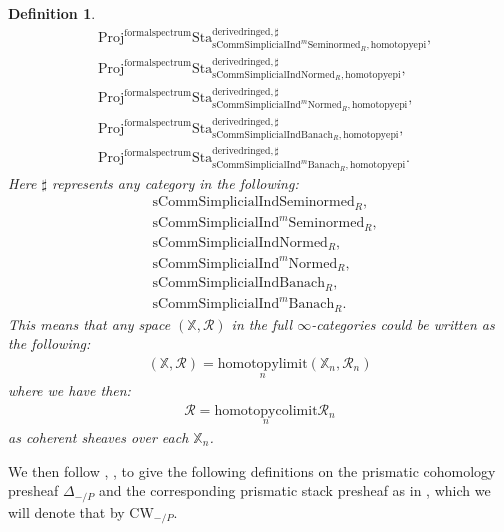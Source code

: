 \documentclass[12pt]{book}
\newtheorem{definition}{Definition}
\begin{document}
\begin{definition}
\begin{align}
&\mathrm{Proj}^\mathrm{formalspectrum}\mathrm{Sta}^\mathrm{derivedringed,\sharp}_{\mathrm{sComm}\mathrm{Simplicial}\mathrm{Ind}^m\mathrm{Seminormed}_R,\mathrm{homotopyepi}},\\
&\mathrm{Proj}^\mathrm{formalspectrum}\mathrm{Sta}^\mathrm{derivedringed,\sharp}_{\mathrm{sComm}\mathrm{Simplicial}\mathrm{Ind}\mathrm{Normed}_R,\mathrm{homotopyepi}},\\
&\mathrm{Proj}^\mathrm{formalspectrum}\mathrm{Sta}^\mathrm{derivedringed,\sharp}_{\mathrm{sComm}\mathrm{Simplicial}\mathrm{Ind}^m\mathrm{Normed}_R,\mathrm{homotopyepi}},\\
&\mathrm{Proj}^\mathrm{formalspectrum}\mathrm{Sta}^\mathrm{derivedringed,\sharp}_{\mathrm{sComm}\mathrm{Simplicial}\mathrm{Ind}\mathrm{Banach}_R,\mathrm{homotopyepi}},\\
&\mathrm{Proj}^\mathrm{formalspectrum}\mathrm{Sta}^\mathrm{derivedringed,\sharp}_{\mathrm{sComm}\mathrm{Simplicial}\mathrm{Ind}^m\mathrm{Banach}_R,\mathrm{homotopyepi}}.	
\end{align}
Here $\sharp$ represents any category in the following:
\begin{align}
&\mathrm{sComm}\mathrm{Simplicial}\mathrm{Ind}\mathrm{Seminormed}_R,\\
&\mathrm{sComm}\mathrm{Simplicial}\mathrm{Ind}^m\mathrm{Seminormed}_R,\\
&\mathrm{sComm}\mathrm{Simplicial}\mathrm{Ind}\mathrm{Normed}_R,\\
&\mathrm{sComm}\mathrm{Simplicial}\mathrm{Ind}^m\mathrm{Normed}_R,\\
&\mathrm{sComm}\mathrm{Simplicial}\mathrm{Ind}\mathrm{Banach}_R,\\
&\mathrm{sComm}\mathrm{Simplicial}\mathrm{Ind}^m\mathrm{Banach}_R.	
\end{align}	
This means that any space $(\mathbb{X},\mathcal{R})$ in the full $\infty$-categories could be written as the following:
\begin{align}
(\mathbb{X},\mathcal{R})=\underset{n}{\mathrm{homotopylimit}}(\mathbb{X}_n,\mathcal{R}_n)	
\end{align}
where we have then:
\begin{align}
\mathcal{R}=\underset{n}{\mathrm{homotopycolimit}}\mathcal{R}_n	
\end{align}
as coherent sheaves over each $\mathbb{X}_n$.

	
\end{definition}




\indent We then follow \cite{BS}, \cite{BL}, \cite{Dr1} to give the following definitions on the prismatic cohomology presheaf $\Delta_{-/P}$ and the corresponding prismatic stack presheaf as in \cite{BL}, which we will denote that by $\mathrm{CW}_{-/P}$.
\end{document}
